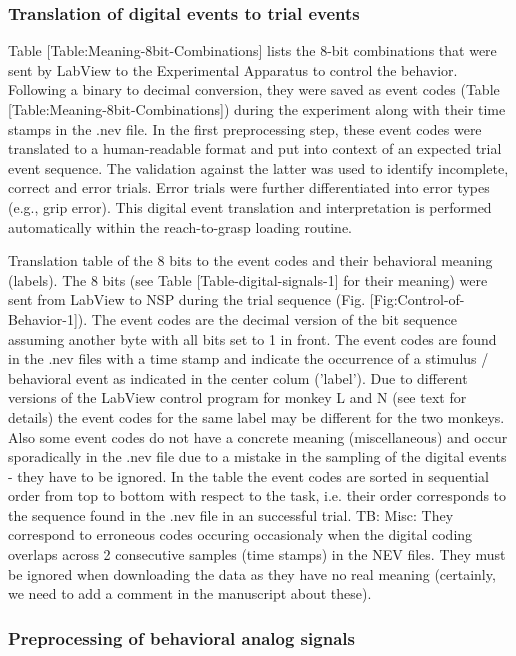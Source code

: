 \subsubsection{Translation of digital events to trial events }

Table [Table:Meaning-8bit-Combinations] lists the 8-bit combinations that were sent by LabView to the Experimental Apparatus to control the behavior. Following a binary to decimal conversion, they were saved as event codes (Table [Table:Meaning-8bit-Combinations]) during the experiment along with their time stamps in the .nev file. In the first preprocessing step, these event codes were translated to a human-readable format and put into context of an expected trial event sequence. The validation against the latter was used to identify incomplete, correct and error trials. Error trials were further differentiated into error types (e.g., grip error). This digital event translation and interpretation is performed automatically within the reach-to-grasp loading routine. 

Translation table of the 8 bits to the event codes and their behavioral meaning (labels). The 8 bits (see Table [Table-digital-signals-1] for their meaning) were sent from LabView to NSP during the trial sequence (Fig. [Fig:Control-of-Behavior-1]). The event codes are the decimal version of the bit sequence assuming another byte with all bits set to 1 in front. The event codes are found in the .nev files with a time stamp and indicate the occurrence of a stimulus / behavioral event as indicated in the center colum ('label'). Due to different versions of the LabView control program for monkey L and N (see text for details) the event codes for the same label may be different for the two monkeys. Also some event codes do not have a concrete meaning (miscellaneous) and occur sporadically in the .nev file due to a mistake in the sampling of the digital events - they have to be ignored. In the table the event codes are sorted in sequential order from top to bottom with respect to the task, i.e. their order corresponds to the sequence found in the .nev file in an successful trial. TB: Misc: They correspond to erroneous codes occuring occasionaly when the digital coding overlaps across 2 consecutive samples (time stamps) in the NEV files. They must be ignored when downloading the data as they have no real meaning (certainly, we need to add a comment in the manuscript about these). 

\subsubsection{Preprocessing of behavioral analog signals}

